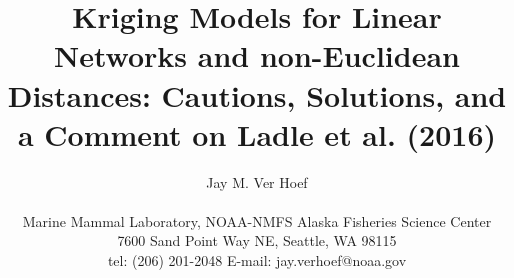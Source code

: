 \documentclass[11pt, titlepage]{article}\usepackage[]{graphicx}\usepackage[]{color}
\begin{document}

\titlepage
\title {Kriging Models for Linear Networks and non-Euclidean Distances: Cautions, Solutions, and a Comment on Ladle et al. (2016)}
\author{Jay M. Ver Hoef \\
\hrulefill \\ 
Marine Mammal Laboratory, NOAA-NMFS Alaska Fisheries Science Center\\
7600 Sand Point Way NE, Seattle, WA 98115\\
tel: (206) 201-2048 \hspace{.5cm} E-mail: jay.verhoef@noaa.gov\\
\hrulefill \\
}

\maketitle
\end{document}
